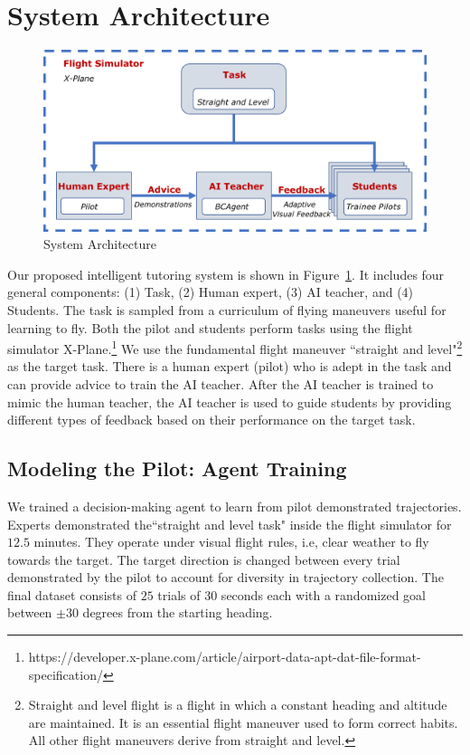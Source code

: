 \documentclass[letterpaper]{article}
\begin{document}
\section{System Architecture}
\begin{figure}[t]
	\begin{minipage}{1\linewidth}
		\centering \small
		\includegraphics[width=\textwidth]{img/system1.pdf}
		\caption{System Architecture}
		\label{fig:system}
	\end{minipage}
\end{figure}

Our proposed intelligent tutoring system is shown in Figure~\ref{fig:system}. It includes four general components: (1) Task, (2) Human expert, (3) AI teacher, and (4) Students. The task is sampled from a curriculum of flying maneuvers useful for learning to fly. Both the pilot and students perform tasks using the flight simulator X-Plane.\footnote{https://developer.x-plane.com/article/airport-data-apt-dat-file-format-specification/} We use the fundamental flight maneuver ``straight and level"\footnote{\label{note1}Straight and level flight is a flight in which a constant heading and altitude are maintained. It is an essential flight maneuver used to form correct habits. All other flight maneuvers derive from straight and level.} as the target task. There is a human expert (pilot) who is adept in the task and can provide advice to train the AI teacher. After the AI teacher is trained to mimic the human teacher, the AI teacher is used to guide students by providing different types of feedback based on their performance on the target task.

\subsection{Modeling the Pilot: Agent Training}

We trained a decision-making agent to learn from pilot demonstrated trajectories. Experts demonstrated the``straight and level task" inside the flight simulator for $12.5$ minutes. They operate under visual flight rules, i.e, clear weather to fly towards the target. The target direction is changed between every trial demonstrated by the pilot to account for diversity in trajectory collection. The final dataset consists of $25$ trials of $30$ seconds each with a randomized goal between $\pm 30$ degrees from the starting heading.
\end{document}

